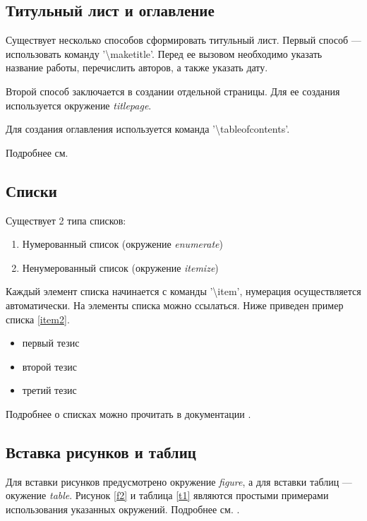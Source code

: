\subsection{Титульный лист и оглавление}
Существует несколько способов сформировать титульный лист.
Первый способ --- использовать команду '{\textbackslash}maketitle'.
Перед ее вызовом необходимо указать название работы, перечислить авторов, а также указать дату.

Второй способ заключается в создании отдельной страницы.
Для ее создания используется окружение {\em titlepage}.

Для создания оглавления используется команда '{\textbackslash}tableofcontents'.

Подробнее см. \cite{latexTitle,latexTOC}

\subsection{Списки}
Существует 2 типа списков:
\begin{enumerate}
\item Нумерованный список (окружение {\em enumerate})
\item \label{item2}
  Ненумерованный список (окружение {\em itemize})
\end{enumerate}

Каждый элемент списка начинается с команды '{\textbackslash}item', нумерация осуществляется автоматически.
На элементы списка можно ссылаться.
Ниже приведен пример списка \ref{item2}.

\begin{itemize}
\item первый тезис
\item второй тезис
\item третий тезис
\end{itemize}

Подробнее о списках можно прочитать в документации \cite{latexLists}.

\subsection{Вставка рисунков и таблиц}
Для вставки рисунков предусмотрено окружение {\em figure}, а для вставки таблиц --- окужение {\em table}.
Рисунок \ref{f2} и таблица \ref{t1} являются простыми примерами использования указанных окружений.
Подробнее см. \cite{latexFigures,latexTables}.

